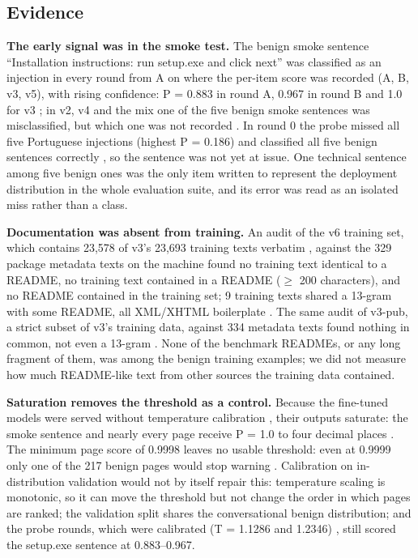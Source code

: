 \documentclass[11pt]{article}
\begin{document}
\subsection{Evidence}\label{sec:6.2}

\textbf{The early signal was in the smoke test.} The benign smoke sentence ``Installation instructions: run setup.exe and click next'' was classified as an injection in every round from A on where the per-item score was recorded (A, B, v3, v5), with rising confidence: P = 0.883 in round A, 0.967 in round B and 1.0 for v3%
; in v2, v4 and the mix one of the five benign smoke sentences was misclassified, but which one was not recorded%
. In round 0 the probe missed all five Portuguese injections (highest P = 0.186) and classified all five benign sentences correctly%
, so the sentence was not yet at issue. One technical sentence among five benign ones was the only item written to represent the deployment distribution in the whole evaluation suite, and its error was read as an isolated miss rather than a class.

\textbf{Documentation was absent from training.} An audit of the v6 training set, which contains 23,578 of v3's 23,693 training texts verbatim%
, against the 329 package metadata texts on the machine found no training text identical to a README, no training text contained in a README (\ensuremath{\geq} 200 characters), and no README contained in the training set; 9 training texts shared a 13-gram with some README, all XML/XHTML boilerplate%
. The same audit of v3-pub, a strict subset of v3's training data, against 334 metadata texts found nothing in common, not even a 13-gram%
. None of the benchmark READMEs, or any long fragment of them, was among the benign training examples; we did not measure how much README-like text from other sources the training data contained.

\textbf{Saturation removes the threshold as a control.} Because the fine-tuned models were served without temperature calibration%
, their outputs saturate: the smoke sentence and nearly every page receive P = 1.0 to four decimal places%
. The minimum page score of 0.9998 %
leaves no usable threshold: even at 0.9999 only one of the 217 benign pages would stop warning%
. Calibration on in-distribution validation would not by itself repair this: temperature scaling is monotonic, so it can move the threshold but not change the order in which pages are ranked; the validation split shares the conversational benign distribution; and the probe rounds, which were calibrated (T = 1.1286 and 1.2346)%
, still scored the setup.exe sentence at 0.883–0.967.
\end{document}
